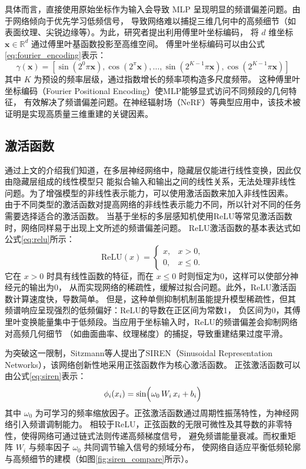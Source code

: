 具体而言，直接使用原始坐标作为输入会导致 MLP 呈现明显的频谱偏差问题\cite{pmlr-v97-rahaman19a}。由于网络倾向于优先学习低频信号，
导致网络难以捕捉三维几何中的高频细节（如表面纹理、尖锐边缘等）。为此，研究者提出利用傅里叶坐标编码，
将 $d$ 维坐标 $\mathbf{x}\in\mathbb{R}^d$ 通过傅里叶基函数投影至高维空间。
傅里叶坐标编码可以由公式\eqref{eq:fourier_encoding}表示：
\begin{equation}
\gamma(\mathbf{x})=\left[\sin\left(2^0\pi \mathbf{x}\right),\cos\left(2^\pi \mathbf{x}\right),\ldots,\sin\left(2^{K-1}\pi \mathbf{x}\right),\cos\left(2^{K-1}\pi \mathbf{x}\right)\right]
\label{eq:fourier_encoding}
\end{equation}
其中 $K$ 为预设的频率层级，通过指数增长的频率项构造多尺度频带。
这种傅里叶坐标编码（Fourier Positional Encoding）使MLP能够显式访问不同频段的几何特征，
有效解决了频谱偏差问题。在神经辐射场（NeRF）等典型应用中，该技术被证明是实现高质量三维重建的关键因素。

\subsection{激活函数}

通过上文的介绍我们知道，在多层神经网络中，隐藏层仅能进行线性变换，因此仅由隐藏层组成的线性模型只
能拟合输入和输出之间的线性关系，无法处理非线性问题。为了增强模型的非线性表示能力，可以使用激活函数来加入非线性因素。
由于不同类型的激活函数对提高网络的非线性表示能力不同，所以针对不同的任务需要选择适合的激活函数。
当基于坐标的多层感知机使用ReLU等常见激活函数时，网络同样易于出现上文所述的频谱偏差问题。
ReLU激活函数的基本表达式如公式\eqref{eq:relu}所示：
\begin{equation}\label{eq:relu}
\text{ReLU}(x)=
\begin{cases}
x, & x>0,\\[1mm]
0, & x\leq 0.
\end{cases}
\end{equation}
它在 $x>0$ 时具有线性函数的特征，而在 $x\leq 0$ 时则恒定为0，这样可以使部分神经元的输出为0，
从而实现网络的稀疏性，缓解过拟合问题。此外，ReLU激活函数计算速度快，导数简单。
但是，这种单侧抑制机制虽能提升模型稀疏性，但其频谱响应呈现强烈的低频偏好：ReLU的导数在正区间为常数1，
负区间为0，其傅里叶变换能量集中于低频段。当应用于坐标输入时，ReLU的频谱偏差会抑制网络对高频几何细节
（如曲面曲率、纹理梯度）的捕捉，导致重建结果过度平滑。

为突破这一限制，Sitzmann等人\cite{sitzmann2020implicit}提出了SIREN（Sinusoidal Representation Networks），该网络创新性地采用正弦函数作为核心激活函数。
正弦激活函数可以由公式\eqref{eq:siren}表示：
\begin{equation}\label{eq:siren}
\phi_i(x_i)=\sin\Bigl(\omega_0\,W_i\,x_i+b_i\Bigr)
\end{equation}
其中 $\omega_0$ 为可学习的频率缩放因子。正弦激活函数通过周期性振荡特性，为神经网络引入频谱调制能力。
相较于ReLU，正弦函数的无限可微性及其导数的非零特性，使得网络可通过链式法则传递高频梯度信号，
避免频谱能量衰减。而权重矩阵 $W_i$ 与频率因子 $\omega_0$ 共同调节输入信号的频域分布，
使网络自适应平衡低频轮廓与高频细节的建模（如图\ref{fig:siren_compare}所示）。

